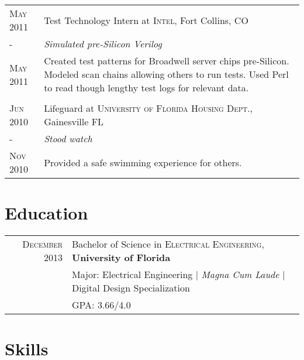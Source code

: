 \documentclass[a4paper,10pt]{article} %
\begin{document}
\begin{tabular}{p{1.5cm}|p{12.5cm}}

\centering\textsc{May 2011} & Test Technology Intern at \textsc{Intel}, Fort Collins, CO \emph{}\\
\centering\textsc{-}& \emph{Simulated pre-Silicon Verilog}\\
\centering\textsc{May 2011}&\footnotesize{Created test patterns for Broadwell server chips pre-Silicon. Modeled scan chains allowing others to run tests. Used Perl to read though lengthy test logs for relevant data.}\\
\multicolumn{2}{c}{} \\


\centering\textsc{Jun 2010} & Lifeguard at \textsc{University of Florida Housing Dept.}, Gainesville FL \\
\centering\textsc{-} & \emph{Stood watch}\\
\centering\textsc{Nov 2010}& \footnotesize{Provided a safe swimming experience for others.}\\
\end{tabular}


\section{Education}

\begin{tabular}{rl}
\textsc{December} 2013 & Bachelor of Science in \textsc{Electrical Engineering}, \textbf{University of Florida}\\
& \small{Major: Electrical Engineering  | \emph{Magna Cum Laude}  |  Digital Design Specialization}\\
&\normalsize \textsc{GPA}: 3.66/4.0\\


\end{tabular}


\section{Skills}
\end{document}
